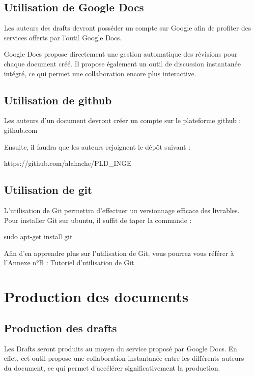 \documentclass{mise_en_page}
\begin{document}
\subsection{Utilisation de
Google Docs}
Les auteurs des drafts devront posséder un compte sur Google afin de
profiter des services offerts par l’outil Google Docs.




Google Docs propose directement une gestion automatique des révisions
pour chaque document créé. Il propose également un outil de discussion
instantanée intégré, ce qui permet une collaboration encore plus
interactive.

\subsection{Utilisation de github}
Les auteurs d’un document devront créer un compte sur le plateforme
github : github.com 




Ensuite, il faudra que les auteurs rejoignent le dépôt suivant :

https://github.com/alahache/PLD\_INGE




\subsection{Utilisation de git}




L’utilisation de Git permettra d’effectuer un versionnage efficace des
livrables. Pour installer Git sur ubuntu, il suffit de taper la
commande :

sudo apt-get install git




Afin d’en apprendre plus sur l’utilisation de Git, vous pourrez vous
référer à l’Annexe n°B : Tutoriel d’utilisation de Git

\section{Production des documents}
\subsection{Production des drafts}
Les Drafts seront produits au moyen du service proposé par Google Docs.
En effet, cet outil propose une collaboration instantanée entre les
différents auteurs du document, ce qui permet d’accélérer
significativement la production.
\end{document}
